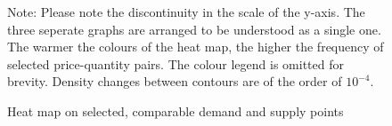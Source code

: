 \begin{figure}[!ht]
\begin{center}
\caption{Heat map on selected, comparable demand and supply points}
\label{g10el}
\end{center}
{ \small Note: Please note the discontinuity in the scale of the y-axis. The three seperate graphs are arranged to be understood as a single one. The warmer the colours of the heat map, the higher the frequency of selected price-quantity pairs. The colour legend is omitted for brevity. Density changes between contours are of the order of $10^{-4}$.} 
\end{figure}


